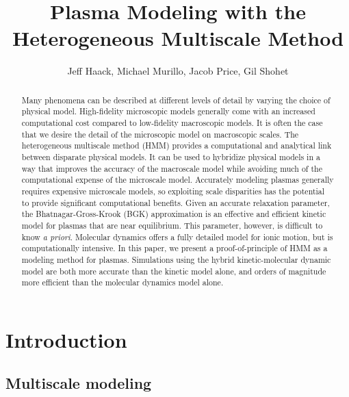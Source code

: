 \documentclass{article}
\title{Plasma Modeling with the Heterogeneous Multiscale Method}
\author{Jeff Haack, Michael Murillo, Jacob Price, Gil Shohet}
\begin{document}
\maketitle

\begin{abstract}
Many phenomena can be described at different levels of detail by varying the choice of physical model. High-fidelity microscopic models generally come with an increased computational cost compared to low-fidelity macroscopic models. It is often the case that we desire the detail of the microscopic model on macroscopic scales. The heterogeneous multiscale method (HMM) provides a computational and analytical link between disparate physical models. It can be used to hybridize physical models in a way that improves the accuracy of the macroscale model while avoiding much of the computational expense of the microscale model. Accurately modeling plasmas generally requires expensive microscale models, so exploiting scale disparities has the potential to provide significant computational benefits. Given an accurate relaxation parameter, the Bhatnagar-Gross-Krook (BGK) approximation is an effective and efficient kinetic model for plasmas that are near equilibrium. This parameter, however, is difficult to know \emph{a priori}. Molecular dynamics offers a fully detailed model for ionic motion, but is computationally intensive. In this paper, we present a proof-of-principle of HMM as a modeling method for plasmas. Simulations using the hybrid kinetic-molecular dynamic model are both more accurate than the kinetic model alone, and orders of magnitude more efficient than the molecular dynamics model alone.
\end{abstract}

\pagebreak

\section{Introduction}

\subsection{Multiscale modeling}
\end{document}
